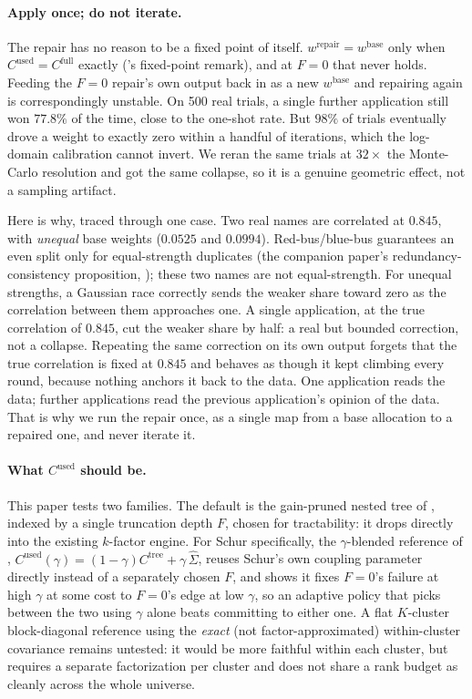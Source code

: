 \documentclass[11pt]{article}
\begin{document}
\paragraph{Apply once; do not iterate.} The repair has no reason to be a
fixed point of itself. $w^{\mathrm{repair}} = w^{\mathrm{base}}$ only when
$C^{\mathrm{used}} = C^{\mathrm{full}}$ exactly ('s
fixed-point remark), and at $F=0$ that never holds. Feeding the $F=0$
repair's own output back in as a new $w^{\mathrm{base}}$ and repairing
again is correspondingly unstable. On 500 real trials, a single further
application still won $77.8\%$ of the time, close to the one-shot rate. But
$98\%$ of trials eventually drove a weight to exactly zero within a handful
of iterations, which the log-domain calibration cannot invert. We reran the
same trials at $32\times$ the Monte-Carlo resolution and got the same
collapse, so it is a genuine geometric effect, not a sampling artifact.

Here is why, traced through one case. Two real names are correlated at
$0.845$, with \emph{unequal} base weights ($0.0525$ and $0.0994$).
Red-bus/blue-bus \parencite{mcfadden1974} guarantees an even split only for
equal-strength duplicates (the companion paper's redundancy-consistency
proposition, \parencite{cotton2026polish}); these two names are not
equal-strength. For unequal strengths, a Gaussian race correctly sends the
weaker share toward zero as the correlation between them approaches one. A
single application, at the true correlation of $0.845$, cut the weaker
share by half: a real but bounded correction, not a collapse. Repeating the
same correction on its own output forgets that the true correlation is
fixed at $0.845$ and behaves as though it kept climbing every round,
because nothing anchors it back to the data. One application reads the
data; further applications read the previous application's opinion of the
data. That is why we run the repair once, as a single map from a base
allocation to a repaired one, and never iterate it.

\paragraph{What $C^{\mathrm{used}}$ should be.} This paper tests two
families. The default is the gain-pruned nested tree of ,
indexed by a single truncation depth $F$, chosen for tractability: it drops
directly into the existing $k$-factor engine. For Schur specifically, the
$\gamma$-blended reference of ,
$C^{\mathrm{used}}(\gamma)=(1-\gamma)C^{\mathrm{tree}}+\gamma\,\hat\Sigma$,
reuses Schur's own coupling parameter directly instead of a separately
chosen $F$, and  shows it fixes $F=0$'s failure at high
$\gamma$ at some cost to $F=0$'s edge at low $\gamma$, so an adaptive
policy that picks between the two using $\gamma$ alone beats committing to
either one. A flat $K$-cluster block-diagonal reference using the
\emph{exact} (not factor-approximated) within-cluster covariance remains
untested: it would be more faithful within each cluster, but requires a
separate factorization per cluster and does not share a rank budget as
cleanly across the whole universe.
\end{document}
